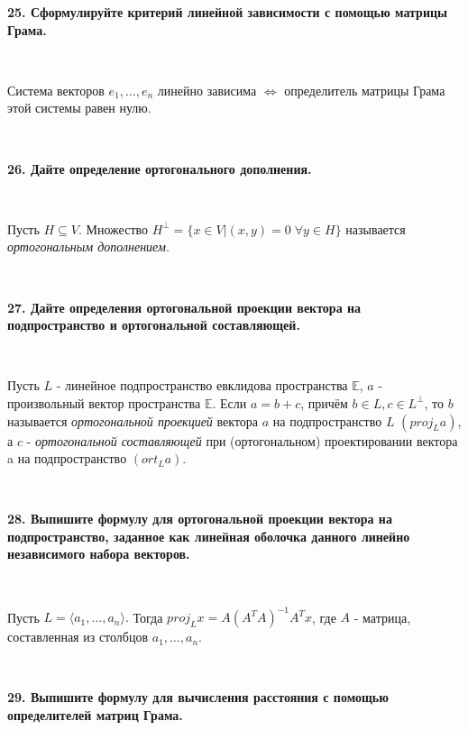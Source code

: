 \documentclass{article}
\begin{document}
    \textbf{25. Сформулируйте критерий линейной зависимости с помощью матрицы Грама.}

    $\;$
        {
        \setlength{\parindent}{0.4cm}
        \hangindent=0.4cm

        Система векторов $e_1, \dots, e_n$
        линейно зависима $\Leftrightarrow$ определитель матрицы Грама этой системы равен нулю.

        $\;$
        \setlength{\parindent}{0cm}
        \hangindent=0cm
    }


    \textbf{26. Дайте определение ортогонального дополнения.}

    $\;$
        {
        \setlength{\parindent}{0.4cm}
        \hangindent=0.4cm

        Пусть $H \subseteq V$. Множество $H^\perp=\{x\in V | (x,y)=0 \; \forall y \in H\}$ называется \textit{ортогональным дополнением}.

        $\;$
        \setlength{\parindent}{0cm}
        \hangindent=0cm
    }

    \textbf{27. Дайте определения ортогональной проекции вектора на подпространство и ортогональной составляющей.}

    {
        $\;$
        \setlength{\parindent}{0.4cm}
        \hangindent=0.4cm

    Пусть $L$ - линейное подпространство евклидова пространства
        $\mathbb{E}$, $a$ - произвольный вектор пространства $\mathbb{E}$. Если $a = b + c$, причём $b \in L, c \in L ^ \perp$, то $b$ называется \textit{ортогональной проекцией} вектора $a$ на
    подпространство $L$ $(proj_La)$, а $c$ - \textit{ортогональной составляющей} при (ортогональном) проектировании вектора a на подпространство $(ort_La)$.

        $\;$
        \setlength{\parindent}{0cm}
        \hangindent=0cm
    }

    \textbf{28. Выпишите формулу для ортогональной проекции вектора на подпространство, заданное как линейная оболочка данного линейно независимого набора векторов.}

    {
        $\;$
        \setlength{\parindent}{0.4cm}
        \hangindent=0.4cm

    Пусть $L=\langle a_1, \dots, a_n \rangle.$ Тогда $proj_L x=A(A^T A)^{-1}A^Tx$, где $A$ - матрица, составленная из столбцов $a_1, \dots, a_n$.

        $\;$
        \setlength{\parindent}{0cm}
        \hangindent=0cm
    }

    \textbf{29. Выпишите формулу для вычисления расстояния с помощью определителей матриц Грама.}
\end{document}
